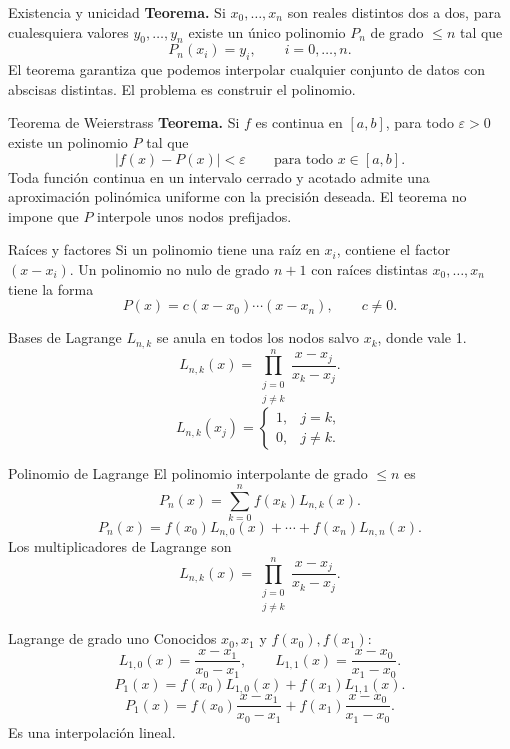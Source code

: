 \documentclass[original_version/main.tex]{subfiles}
\begin{document}
\begin{frame}[t]{Existencia y unicidad}
\textbf{Teorema.} Si $x_0,\ldots,x_n$ son reales distintos dos a dos, para cualesquiera valores $y_0,\ldots,y_n$ existe un único polinomio $P_n$ de grado $\le n$ tal que
\[P_n(x_i)=y_i,\qquad i=0,\ldots,n.\]
\bigskip
El teorema garantiza que podemos interpolar cualquier conjunto de datos con abscisas distintas.
\medskip
El problema es construir el polinomio.
\end{frame}
\begin{frame}[t]{Teorema de Weierstrass}
\textbf{Teorema.} Si $f$ es continua en $[a,b]$, para todo $\varepsilon>0$ existe un polinomio $P$ tal que
\[|f(x)-P(x)|<\varepsilon\qquad\text{para todo }x\in[a,b].\]
\bigskip
Toda función continua en un intervalo cerrado y acotado admite una aproximación polinómica uniforme con la precisión deseada.
\medskip
El teorema no impone que $P$ interpole unos nodos prefijados.
\end{frame}
\begin{frame}[t]{Raíces y factores}
Si un polinomio tiene una raíz en $x_i$, contiene el factor $(x-x_i)$.
\medskip
Un polinomio no nulo de grado $n+1$ con raíces distintas $x_0,\ldots,x_n$ tiene la forma
\[P(x)=c(x-x_0)\cdots(x-x_n),\qquad c\ne0.\]
\end{frame}
\begin{frame}[t]{Bases de Lagrange}
\small $L_{n,k}$ se anula en todos los nodos salvo $x_k$, donde vale 1.
\[L_{n,k}(x)=\prod_{\substack{j=0\\j\ne k}}^n\frac{x-x_j}{x_k-x_j}.\]\[L_{n,k}(x_j)=\begin{cases}1,&j=k,\\0,&j\ne k.\end{cases}\]
\end{frame}
\begin{frame}[t]{Polinomio de Lagrange}
El polinomio interpolante de grado $\le n$ es
\[P_n(x)=\sum_{k=0}^n f(x_k)L_{n,k}(x).\]\[P_n(x)=f(x_0)L_{n,0}(x)+\cdots+f(x_n)L_{n,n}(x).\]
Los multiplicadores de Lagrange son
\[L_{n,k}(x)=\prod_{\substack{j=0\\j\ne k}}^n\frac{x-x_j}{x_k-x_j}.\]
\end{frame}
\begin{frame}[t]{Lagrange de grado uno}
\small Conocidos $x_0,x_1$ y $f(x_0),f(x_1)$:
\[L_{1,0}(x)=\frac{x-x_1}{x_0-x_1},\qquad
L_{1,1}(x)=\frac{x-x_0}{x_1-x_0}.\]
\[P_1(x)=f(x_0)L_{1,0}(x)+f(x_1)L_{1,1}(x).\]
\[P_1(x)=f(x_0)\frac{x-x_1}{x_0-x_1}+f(x_1)\frac{x-x_0}{x_1-x_0}.\]
Es una interpolación lineal.
\end{frame}
\end{document}
